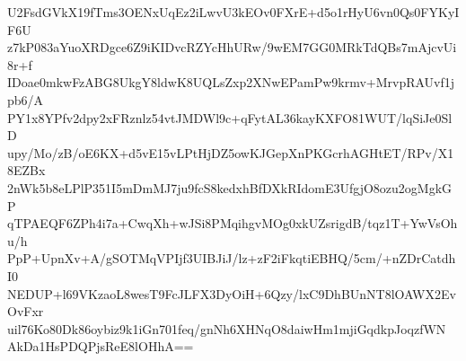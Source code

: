 U2FsdGVkX19fTms3OENxUqEz2iLwvU3kEOv0FXrE+d5o1rHyU6vn0Qs0FYKyIF6U
z7kP083aYuoXRDgce6Z9iKIDvcRZYcHhURw/9wEM7GG0MRkTdQBs7mAjcvUi8r+f
IDoae0mkwFzABG8UkgY8ldwK8UQLsZxp2XNwEPamPw9krmv+MrvpRAUvf1jpb6/A
PY1x8YPfv2dpy2xFRznlz54vtJMDWl9c+qFytAL36kayKXFO81WUT/lqSiJe0SlD
upy/Mo/zB/oE6KX+d5vE15vLPtHjDZ5owKJGepXnPKGcrhAGHtET/RPv/X18EZBx
2nWk5b8eLPlP351I5mDmMJ7ju9fcS8kedxhBfDXkRIdomE3UfgjO8ozu2ogMgkGP
qTPAEQF6ZPh4i7a+CwqXh+wJSi8PMqihgvMOg0xkUZsrigdB/tqz1T+YwVsOhu/h
PpP+UpnXv+A/gSOTMqVPIjf3UIBJiJ/lz+zF2iFkqtiEBHQ/5cm/+nZDrCatdhI0
NEDUP+l69VKzaoL8wesT9FcJLFX3DyOiH+6Qzy/lxC9DhBUnNT8lOAWX2EvOvFxr
uil76Ko80Dk86oybiz9k1iGn701feq/gnNh6XHNqO8daiwHm1mjiGqdkpJoqzfWN
AkDa1HsPDQPjsReE8lOHhA==
